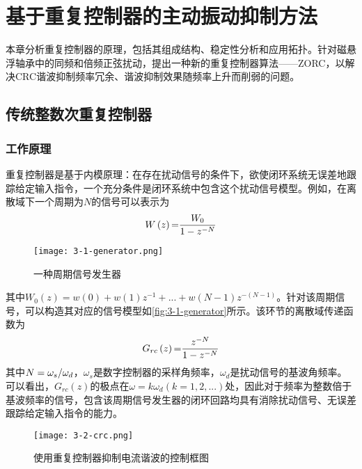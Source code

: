 \documentclass[
  lang=cn,
  degree=master,
  openany,oneside
]{nuaathesis}
\begin{document}
\chapter{基于重复控制器的主动振动抑制方法}
本章分析重复控制器的原理，包括其组成结构、稳定性分析和应用拓扑。针对磁悬浮轴承中的同频和倍频正弦扰动，提出一种新的重复控制器算法——ZORC，以解决CRC谐波抑制频率冗余、谐波抑制效果随频率上升而削弱的问题。

\section{传统整数次重复控制器}
\subsection{工作原理}
重复控制器是基于内模原理\cite{francis1975internal}：在存在扰动信号的条件下，欲使闭环系统无误差地跟踪给定输入指令，一个充分条件是闭环系统中包含这个扰动信号模型。例如，在离散域下一个周期为$N$的信号可以表示为
\begin{equation}
\label{eq3-1}
W\left( z \right){\rm{ = }}{{{W_0}} \over {1 - {z^{ - N}}}}
\end{equation}

\begin{figure}[h!]
	\texttt{[image: 3-1-generator.png]}
	\caption{一种周期信号发生器}
	\label{fig:3-1-generator}
\end{figure}
其中${W_0}\left( z \right) = w\left( 0 \right) + w\left( 1 \right){z^{ - 1}} + ... + w\left( {N - 1} \right){z^{ - \left( {N - 1} \right)}}$。针对该周期信号，可以构造其对应的信号模型如\autoref{fig:3-1-generator}所示。该环节的离散域传递函数为
\begin{equation}
\label{eq3-2}
{G_{rc}}\left( z \right){\rm{ = }}{{{z^{ - N}}} \over {1 - {z^{ - N}}}}
\end{equation}
其中$N = {{{\omega _s}} \mathord{\left/
 {\vphantom {{{\omega _s}} {{\omega _d}}}} \right.
 \kern-\nulldelimiterspace} {{\omega _d}}}$，$\omega _s$是数字控制器的采样角频率，$\omega _d$是扰动信号的基波角频率。可以看出，$G_{rc}(z)$的极点在$\omega = k\omega_d(k = 1,2,...)$处，因此对于频率为整数倍于基波频率的信号，包含该周期信号发生器的闭环回路均具有消除扰动信号、无误差跟踪给定输入指令的能力。
 
\begin{figure}[h!]
	\texttt{[image: 3-2-crc.png]}
	\caption{使用重复控制器抑制电流谐波的控制框图}
	\label{fig:3-2-crc}
\end{figure}
\end{document}
